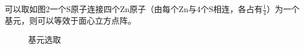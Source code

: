 \documentclass{article}
\begin{document}
	
	可以取如图2一个S原子连接四个Zn原子（由每个Zn与4个S相连，各占有$  \frac{1}{4} $）为一个基元，则可以等效于面心立方点阵。
	\begin{figure}[!h]
		\centering
		\caption{\heiti{}基元选取}
		
	\end{figure}
	
\end{document}
